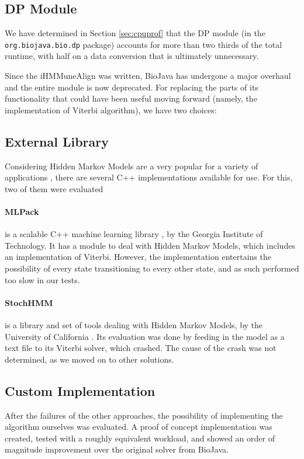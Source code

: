 \subsection{DP Module}
We have determined in Section \ref{sec:cpuprof} that the DP module (in the \texttt{org.biojava.bio.dp} package) accounts for more than two thirds of the total runtime, with half on a data conversion that is ultimately unnecessary.

Since the iHMMuneAlign was written, BioJava has undergone a major overhaul \autocite{biojava3} and the entire module is now deprecated. For replacing the parts of its functionality that could have been useful moving forward (namely, the implementation of Viterbi algorithm), we have two choices:

\subsection{External Library}
Considering Hidden Markov Models are a very popular for a variety of applications \autocite{hmm}, there are several C++ implementations available for use. For this, two of them were evaluated

\paragraph{MLPack} is a scalable C++ machine learning library \autocite{mlpack}, by the Georgia Institute of Technology. It has a module to deal with Hidden Markov Models, which includes an implementation of Viterbi. However, the implementation entertains the possibility of every state transitioning to every other state, and as such performed too slow in our tests.

\paragraph{StochHMM} is a library and set of tools dealing with Hidden Markov Models, by the University of California \autocite{stochhmm}. Its evaluation was done by feeding in the model as a text file to its Viterbi solver, which crashed. The cause of the crash was not determined, as we moved on to other solutions.

\subsection{Custom Implementation}
After the failures of the other approaches, the possibility of implementing the algorithm ourselves was evaluated. A proof of concept implementation was created, tested with a roughly equivalent workload, and showed an order of magnitude improvement over the original solver from BioJava.


